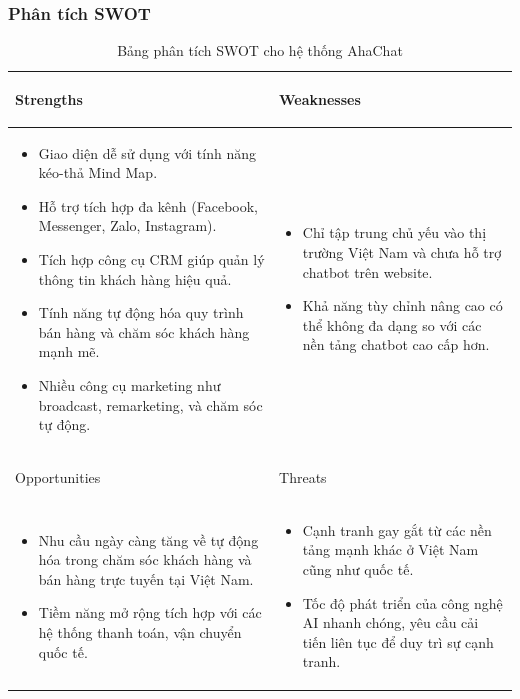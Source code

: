 \subsubsection{Phân tích SWOT}
\begin{table}[H]
\centering
\begin{tabular}{|p{7cm}|p{7cm}|}
\hline
 \begin{center}
     Strengths
 \end{center} & \begin{center}
     Weaknesses
 \end{center}  \\
\hline
\begin{itemize}
    \item Giao diện dễ sử dụng với tính năng kéo-thả Mind Map.
    \item Hỗ trợ tích hợp đa kênh (Facebook,  Messenger, Zalo, Instagram).
    \item Tích hợp công cụ CRM giúp quản lý thông tin khách hàng hiệu quả.
    \item Tính năng tự động hóa quy trình bán hàng và chăm sóc khách hàng mạnh mẽ.
    \item Nhiều công cụ marketing như broadcast, remarketing, và chăm sóc tự động.
\end{itemize} &  
\begin{itemize}
    \item Chỉ tập trung chủ yếu vào thị trường Việt Nam và chưa hỗ trợ chatbot trên website.
\item Khả năng tùy chỉnh nâng cao có thể không đa dạng so với các nền tảng chatbot cao cấp hơn.
\end{itemize}\\
\hline
\begin{center}
    Opportunities
\end{center} & \begin{center}
    Threats
\end{center}\\
\hline
\begin{itemize}
    \item Nhu cầu ngày càng tăng về tự động hóa trong chăm sóc khách hàng và bán hàng trực tuyến tại Việt Nam.
    \item Tiềm năng mở rộng tích hợp với các hệ thống thanh toán, vận chuyển quốc tế.
\end{itemize} &  
\begin{itemize}
    \item Cạnh tranh gay gắt từ các nền tảng mạnh khác ở Việt Nam cũng như quốc tế.
    \item Tốc độ phát triển của công nghệ AI nhanh chóng, yêu cầu cải tiến liên tục để duy trì sự cạnh tranh.
\end{itemize}\\
\hline
\end{tabular}
\caption{Bảng phân tích SWOT cho hệ thống AhaChat}
\end{table}
